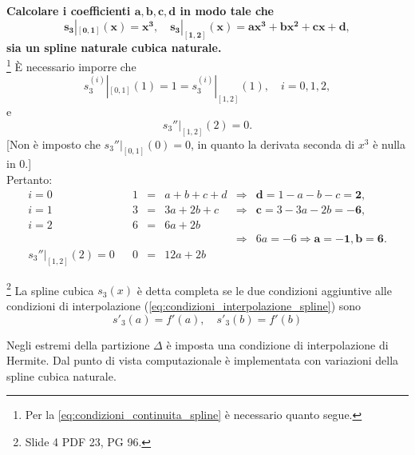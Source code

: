 \begin{example}
	\textbf{Calcolare i coefficienti $\boldsymbol{a,b,c,d}$ in modo tale che}
	\begin{equation*}
		\boldsymbol{s_3|_{[0,1]}(x) = x^3,\quad s_3|_{[1,2]}(x) = a x^3 + b x^2 + c x + d,}
	\end{equation*}
	\textbf{sia un spline naturale cubica naturale.}\\
	\footnote{Per la \ref{eq:condizioni_continuita_spline} è necessario quanto segue.} È necessario imporre che
	\begin{equation*}
		s^{(i)}_3|_{[0,1]}(1) = 1 = s_3^{(i)}|_{[1,2]}(1),\quad i=0,1,2,
	\end{equation*}
	e
	\begin{equation*}
		s_3''|_{[1,2]}(2) = 0.
	\end{equation*}
	[Non è imposto che $s_3''|_{[0,1]}(0) = 0$, in quanto la derivata seconda di $x^3$ è nulla in 0.]\\
	Pertanto:
	\begin{equation*}
		\begin{matrix}
			i = 0 && 1 &=& a + b + c + d &\Rightarrow& \boldsymbol{d=} 1 - a - b - c \boldsymbol{= 2},\\
			i = 1  && 3 &=& 3a + 2b + c &\Rightarrow& \boldsymbol{c=} 3-3a-2b \boldsymbol{=-6},\\
			i = 2 && 6 &=& 6a + 2b\\
			&&&&&\Rightarrow& 6a = -6 \Rightarrow \boldsymbol{a=-1}, \boldsymbol{b=6}.\\
			s_3''|_{[1,2]}(2) = 0 && 0 &=& 12a + 2b
		\end{matrix}
	\end{equation*}
\end{example}

\begin{definition}\footnote{Slide 4 PDF 23, PG 96.}
	La spline cubica $s_3(x)$ è detta completa se le due condizioni aggiuntive alle condizioni di interpolazione (\ref{eq:condizioni_interpolazione_spline}) sono
	\begin{equation}\label{eq:condizioni_spline_cubica_completa}
	    \boxed{s'_3(a)=f'(a),\quad s'_3(b)=f'(b)}
	\end{equation}
\end{definition}

Negli estremi della partizione $\Delta$ è imposta una condizione di interpolazione di Hermite.
Dal punto di vista computazionale è implementata con variazioni della spline cubica naturale.

